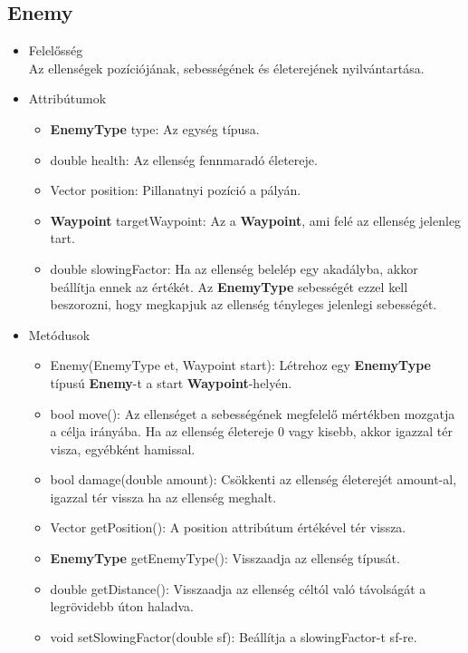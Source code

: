\subsection{Enemy}
\begin{itemize}
\item Felelősség\\
Az ellenségek pozíciójának, sebességének és életerejének nyilvántartása.
\item Attribútumok
	\begin{itemize}
		\item \textbf{EnemyType} type: Az egység típusa.
		\item double health: Az ellenség fennmaradó életereje.
		\item Vector position: Pillanatnyi pozíció a pályán.
		\item \textbf{Waypoint} targetWaypoint: Az a \textbf{Waypoint}, ami felé az ellenség jelenleg tart.
		\item double slowingFactor: Ha az ellenség belelép egy akadályba, akkor beállítja ennek az értékét. Az \textbf{EnemyType} sebességét ezzel kell beszorozni, hogy megkapjuk az ellenség tényleges jelenlegi sebességét.
	\end{itemize}
\item Metódusok
	\begin{itemize}
		\item Enemy(EnemyType et, Waypoint start): Létrehoz egy \textbf{EnemyType} típusú \textbf{Enemy}-t a start \textbf{Waypoint}-helyén.
		\item bool move(): Az ellenséget a sebességének megfelelő mértékben mozgatja a célja irányába. Ha az ellenség életereje 0 vagy kisebb, akkor igazzal tér visza, egyébként hamissal.
		\item bool damage(double amount): Csökkenti az ellenség életerejét amount-al, igazzal tér vissza ha az ellenség meghalt.
		\item Vector getPosition(): A position attribútum értékével tér vissza.
		\item \textbf{EnemyType} getEnemyType(): Visszaadja az ellenség típusát.
		\item double getDistance(): Visszaadja az ellenség céltól való távolságát a legrövidebb úton haladva.
		\item void setSlowingFactor(double sf): Beállítja a slowingFactor-t sf-re.
	\end{itemize}
\end{itemize}


